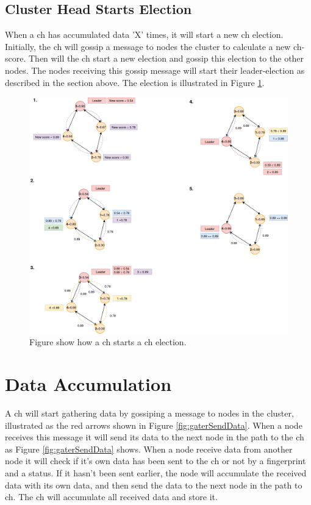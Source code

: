 \documentclass[USenglish]{uit-thesis}
\begin{document}
\newpage 

\subsection{Cluster Head Starts Election}
When a \gls{ch} has accumulated data 'X' times, it will start a new \gls{ch} election. Initially, the \gls{ch} will gossip a message to nodes the cluster to calculate a new \gls{ch}-score. Then will the \gls{ch} start a new election and gossip this election to the other nodes. The nodes receiving this gossip message will start their leader-election as described in the section above. The election is illustrated in Figure \ref{fig:chWantsLeaderElection}.

\begin{figure}
\centering
\includegraphics[width=\textwidth]{LeaderNewLeaderElection2.png}
\caption{Figure show how a \gls{ch} starts a \gls{ch} election.}
\label{fig:chWantsLeaderElection}
\end{figure}


\newpage

\section{Data Accumulation}
A \gls{ch} will start gathering data by gossiping a message to nodes in the cluster, illustrated as the red arrows shown in Figure \ref{fig:gaterSendData}. When a node receives this message it will send its data to the next node in the path to the \gls{ch} as Figure \ref{fig:gaterSendData} shows. When a node receive data from another node it will check if it's own data has been sent to the \gls{ch} or not by a fingerprint and a status. If it hasn't been sent earlier, the node will accumulate the received data with its own data, and then send the data to the next node in the path to \gls{ch}. The \gls{ch} will accumulate all received data and store it.
\end{document}
